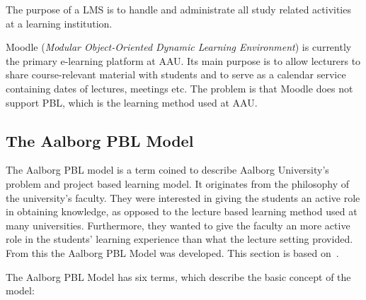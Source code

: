 The purpose of a LMS is to handle and administrate all study related activities at a learning institution.%

Moodle (\emph{Modular Object-Oriented Dynamic Learning Environment}) \citep{moodle} is currently the primary e-learning platform at AAU. 
Its main purpose is to allow lecturers to share course-relevant material with students and to serve as a calendar service containing dates of lectures, meetings etc. 
The problem is that Moodle does not support PBL, which is the learning method used at AAU.

\subsection{The Aalborg PBL Model}
\label{sub:aaupbl}
The Aalborg PBL model is a term coined to describe Aalborg University's problem and project based learning model. 
It originates from the philosophy of the university's faculty. 
They were interested in giving the students an active role in obtaining knowledge, as opposed to the lecture based learning method used at many universities.
Furthermore, they wanted to give the faculty an more active role in the students' learning experience than what the lecture setting provided. 
From this the Aalborg PBL Model was developed. 
This section is based on~\citep{Barge10}.

The Aalborg PBL Model has six terms, which describe the basic concept of the model:

